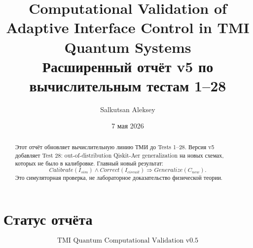 \documentclass[12pt,a4paper]{article}
\title{\textbf{Computational Validation of Adaptive Interface Control in TMI Quantum Systems}\\\large Расширенный отчёт v5 по вычислительным тестам 1--28}
\author{Salkutsan Aleksey}\date{7 мая 2026}
\begin{document}
\maketitle
\begin{abstract}
Этот отчёт обновляет вычислительную линию ТМИ до Tests 1--28. Версия v5 добавляет Test 28: out-of-distribution Qiskit-Aer generalization на новых схемах, которых не было в калибровке. Главный новый результат:
\[Calibrate(I_{sim})\land Correct(I_{circuit})\Rightarrow Generalize(C_{new}).\]
Это симуляторная проверка, не лабораторное доказательство физической теории.
\end{abstract}\tableofcontents\newpage
\section{Статус отчёта}
\[\boxed{\text{TMI Quantum Computational Validation v0.5}}\]
\end{document}
